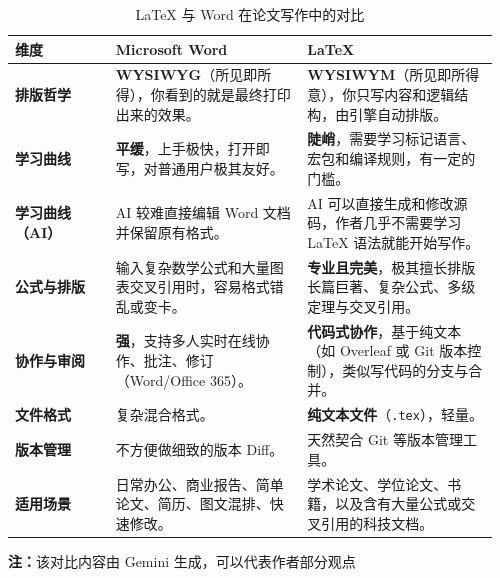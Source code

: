 \begin{table}[htbp]
    \centering
    \caption{\LaTeX{} 与 Word 在论文写作中的对比}
    \label{tab:word-latex}
    \setlength{\tabcolsep}{3pt}
    \begin{tabular}{@{}p{0.20\linewidth}p{0.38\linewidth}p{0.38\linewidth}@{}}
        \toprule
        \textbf{维度} & \textbf{Microsoft Word} & \textbf{\LaTeX} \\
        \midrule
        \textbf{排版哲学}
          & \textbf{WYSIWYG}（所见即所得），你看到的就是最终打印出来的效果。
          & \textbf{WYSIWYM}（所见即所得意），你只写内容和逻辑结构，由引擎自动排版。 \\
        \addlinespace[2pt]
        \textbf{学习曲线}
          & \textbf{平缓}，上手极快，打开即写，对普通用户极其友好。
          & \textbf{陡峭}，需要学习标记语言、宏包和编译规则，有一定的门槛。 \\
        \addlinespace[2pt]
        \textbf{学习曲线（AI）}
          & AI 较难直接编辑 Word 文档并保留原有格式。
          & AI 可以直接生成和修改源码，作者几乎不需要学习 \LaTeX{} 语法就能开始写作。 \\
        \addlinespace[2pt]
        \textbf{公式与排版}
          & 输入复杂数学公式和大量图表交叉引用时，容易格式错乱或变卡。
          & \textbf{专业且完美}，极其擅长排版长篇巨著、复杂公式、多级定理与交叉引用。 \\
        \addlinespace[2pt]
        \textbf{协作与审阅}
          & \textbf{强}，支持多人实时在线协作、批注、修订（Word/Office 365）。
          & \textbf{代码式协作}，基于纯文本（如 Overleaf 或 Git 版本控制），类似写代码的分支与合并。 \\
        \addlinespace[2pt]
        \textbf{文件格式}
          & 复杂混合格式。
          & \textbf{纯文本文件}（\texttt{.tex}），轻量。 \\
        \addlinespace[2pt]
        \textbf{版本管理}
          & 不方便做细致的版本 Diff。
          & 天然契合 Git 等版本管理工具。 \\
        \addlinespace[2pt]
        \textbf{适用场景}
          & 日常办公、商业报告、简单论文、简历、图文混排、快速修改。
          & 学术论文、学位论文、书籍，以及含有大量公式或交叉引用的科技文档。 \\
        \bottomrule
    \end{tabular}
    \par\smallskip
    {\footnotesize\raggedright
    \textbf{注：}该对比内容由 Gemini 生成，可以代表作者部分观点\par}
\end{table}
